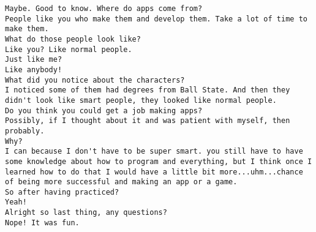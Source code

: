 \begin{lstlisting}
Maybe. Good to know. Where do apps come from?
People like you who make them and develop them. Take a lot of time to make them.
What do those people look like?
Like you? Like normal people.
Just like me?
Like anybody!
What did you notice about the characters?
I noticed some of them had degrees from Ball State. And then they didn't look like smart people, they looked like normal people.
Do you think you could get a job making apps?
Possibly, if I thought about it and was patient with myself, then probably.
Why?
I can because I don't have to be super smart. you still have to have some knowledge about how to program and everything, but I think once I learned how to do that I would have a little bit more...uhm...chance of being more successful and making an app or a game.
So after having practiced?
Yeah!
Alright so last thing, any questions?
Nope! It was fun.
\end{lstlisting}

